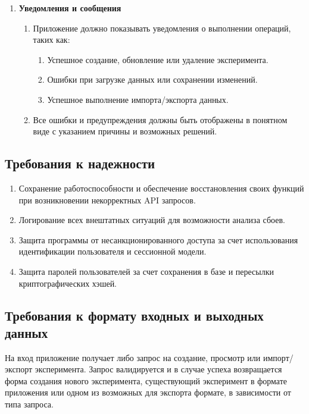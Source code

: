 \documentclass[a4paper,12pt,reqno]{article}
\begin{document}
\begin{enumerate}
        \item \textbf{Уведомления и сообщения}
        \begin{enumerate}[label=\arabic{enumi}.\arabic*.]
            \item Приложение должно показывать уведомления о выполнении операций, таких как:
            \begin{enumerate}[label=\arabic{enumi}.\arabic{enumii}.\arabic*.]
                \item Успешное создание, обновление или удаление эксперимента.
                \item Ошибки при загрузке данных или сохранении изменений.
                \item Успешное выполнение импорта/экспорта данных.
            \end{enumerate}
            \item Все ошибки и предупреждения должны быть отображены в понятном виде с указанием причины и возможных решений.
        \end{enumerate}
    \end{enumerate}

    \subsection{Требования к надежности}
    \begin{enumerate}
        \item Сохранение работоспособности и обеспечение восстановления своих функций при возникновении некорректных API запросов.
        \item Логирование всех внештатных ситуаций для возможности анализа сбоев.
        \item Защита программы от несанкционированного доступа за счет использования идентификации пользователя и сессионной модели.
        \item Защита паролей пользователей за счет сохранения в базе и пересылки криптографических хэшей.
    \end{enumerate}

    \subsection{Требования к формату входных и выходных данных}
    На вход приложение получает либо запрос на создание, просмотр или импорт/экспорт эксперимента. Запрос валидируется и в случае успеха возвращается форма создания нового эксперимента, существующий эксперимент в формате приложения или одном из возможных для экспорта формате, в зависимости от типа запроса.
\end{document}
